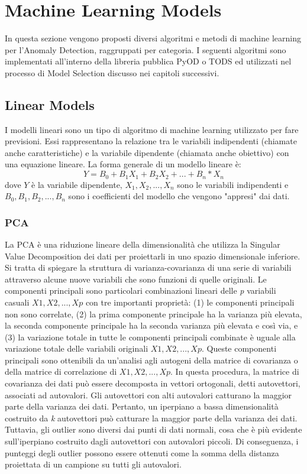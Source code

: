 \section{Machine Learning Models}
In questa sezione vengono proposti diversi algoritmi e metodi di machine learning per l'Anomaly Detection, raggruppati per categoria.
I seguenti algoritmi sono implementati all'interno della libreria pubblica PyOD o TODS ed utilizzati nel processo di Model Selection discusso nei capitoli successivi.

\subsection{Linear Models}
I modelli lineari sono un tipo di algoritmo di machine learning utilizzato per fare previsioni. Essi rappresentano la relazione tra le variabili indipendenti (chiamate anche caratteristiche) e la variabile dipendente (chiamata anche obiettivo) con una equazione lineare. La forma generale di un modello lineare è: 
\[ Y = B_0 + B_1X_1 + B_2X_2 + ... + B_n*X_n\]
dove $ Y $ è la variabile dipendente,  \(X_1, X_2, ..., X_n\)  sono le variabili indipendenti e \( B_0, B_1, B_2, ..., B_n\) sono i coefficienti del modello che vengono "appresi" dai dati.

\subsubsection{PCA}
La PCA è una riduzione lineare della dimensionalità che utilizza la Singular Value Decomposition dei dati per proiettarli in uno spazio dimensionale inferiore. Si tratta di spiegare la struttura di varianza-covarianza di una serie di variabili attraverso alcune nuove variabili che sono funzioni di quelle originali. Le componenti principali sono particolari combinazioni lineari delle \textit{p} variabili casuali  \(X1, X2, ..., Xp\) con tre importanti proprietà: (1) le componenti principali non sono correlate, (2) la prima componente principale ha la varianza più elevata, la seconda componente principale ha la seconda varianza più elevata e così via, e (3) la variazione totale in tutte le componenti principali combinate è uguale alla variazione totale delle variabili originali \(X1, X2, ..., Xp\). 
Queste componenti principali sono ottenibili da un'analisi agli autogeni della matrice di covarianza o della matrice di correlazione di \(X1, X2, ..., Xp\).
In questa procedura, la matrice di covarianza dei dati può essere decomposta in vettori ortogonali, detti autovettori, associati ad autovalori. Gli autovettori con alti autovalori catturano la maggior parte della varianza dei dati. Pertanto, un iperpiano a bassa dimensionalità costruito da \textit{k} autovettori può catturare la maggior parte della varianza dei dati. Tuttavia, gli outlier sono diversi dai punti di dati normali, cosa che è più evidente sull'iperpiano costruito dagli autovettori con autovalori piccoli.
Di conseguenza, i punteggi degli outlier possono essere ottenuti come la somma della distanza proiettata di un campione su tutti gli autovalori.

